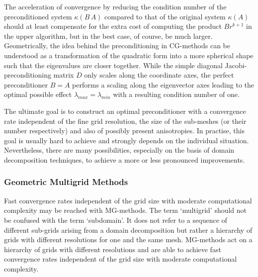 The acceleration of convergence by reducing the condition number of the preconditioned system $\kappa(B \, A)$ compared to that of the original system $\kappa(A)$ should at least compensate for the extra cost of computing the product $B r^{k+1}$ in the upper algorithm, 
but in the best case, of course, be much larger. 
%
Geometrically, the idea behind the preconditioning in CG-methods can be understood as a transformation of the quadratic form into a more spherical shape such that the eigenvalues are closer together. While the simple diagonal Jacobi-preconditioning matrix $D$ only scales along the coordinate axes, the perfect preconditioner $B=A$ performs a scaling along the eigenvector axes leading to the optimal possible effect $\lambda_{max}=\lambda_{min}$ with a resulting condition number of one.



The ultimate goal is to construct an optimal
preconditioner with a convergence rate independent of the fine grid resolution, the size of the sub-meshes (or their number respectively) and also of possibly present anisotropies. In practise, this goal is usually hard to achieve and strongly depends on the individual situation. Nevertheless, there are many possibilities, especially on the basis of  domain decomposition techniques, to achieve a more or less pronounced improvements.%

\subsubsection{Geometric Multigrid Methods} 
\label{SEC_SCARC_mg}

Fast convergence rates independent of the grid size with moderate computational complexity may be reached with MG-methods. The term `multigrid' should not be confused with the term `subdomain'. It does not refer to a sequence of different sub-grids arising from a domain decomposition but rather a hierarchy of grids with different resolutions for one and the same mesh.
MG-methods act on a hierarchy of grids with different resolutions and are able to achieve fast convergence rates independent of the grid size with moderate computational complexity.

